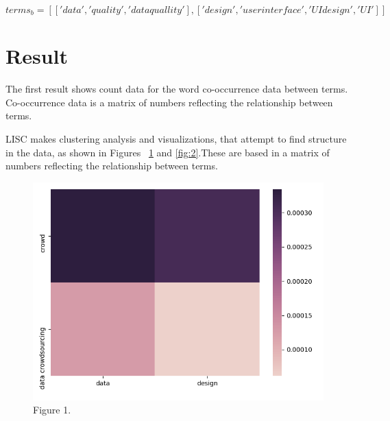 \documentclass{article}
\begin{document}
\begin{equation}
terms_b = [['data','quality', 'data quallity'],['design','user interface','UI design','UI']]
\end{equation}
\section{Result}
 The first result shows count data for the word co-occurrence data between terms.
Co-occurrence data is a matrix of numbers reflecting the relationship between terms. 



LISC makes clustering analysis and visualizations,  that attempt to find structure in the data, as shown in Figures ~\ref{fig:matrix}  and   \ref{fig:2}.These are based in a matrix of numbers reflecting the relationship between terms.


\begin{figure}[!h]
  \centering
  \includegraphics[width=400 pt]{output1.png}
  \caption{Figure 1.}
  \label{fig:matrix}
\end{figure}
\end{document}
